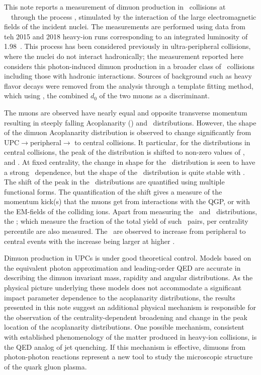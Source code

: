This note reports a measurement of dimuon production in \PbPb\
  collisions at ~\TeV\ through the process \gamgammumu,
  stimulated by the interaction of the large electromagnetic
  fields of the incident nuclei.
The measurements are performed using data from teh 2015 and 2018
  heavy-ion runs corresponding to an integrated luminosity of
  1.98~\inb.
This process has been considered previously in ultra-peripheral
  collisions, where the nuclei do not interact hadronically;
  the measurement reported here considers
  this photon-induced dimuon production in a broader class of \PbPb\
  collisions including those with hadronic interactions.
Sources of background such as heavy flavor decays were removed from
  the analysis through a template fitting method, which using
  \dZeroPair, the combined $d_0$ of the two muons as a discriminant.

The muons are observed have nearly equal and opposite transverse
  momentum resulting in steeply falling Acoplanarity
  (\Aco) and \kperp\ distributions.
However, the shape of the dimuon Acoplanarity distribution is
  observed to change significantly from
  UPC$\longrightarrow$peripheral$\longrightarrow$
  to central collisions.
It particular, for the distributions in central collisions,
  the peak of the distribution is shifted to non-zero values
  of \Aco, and \kperp.
At fixed centrality, the change in shape for the \Aco\
  distribution is seen to have a strong \pt\ dependence,
  but the shape of the \kperp\ distribution is quite stable
  with \pt.
The shift of the peak in the \kperp\ distributions are
  quantified using multiple functional forms.
The quantification of the shift gives a measure of the momentum
  kick(s) that the muons get from interactions with the QGP,
  or with the EM-fields of the colliding ions.
Apart from measuring the \Aco\ and \kperp\ distributions,
  the \NormYields; which measure the fraction of the total
  yield of such \gamgammumu\ pairs, per centrality percentile
  are also measured.
The \NormYields\ are observed to increase from peripheral to
  central events with the increase being larger at higher \pt.


Dimuon production in UPCs is under good theoretical control.
Models based on the equivalent photon approximation and leading-order QED
  are accurate in describing the dimuon invariant mass, rapidity
  and angular distributions.
As the physical picture underlying these models does not accommodate a
  significant impact parameter dependence to the acoplanarity distributions,
  the results presented in this note suggest an additional physical mechanism is
  responsible for the observation of the centrality-dependent broadening
  and change in the peak location of the acoplanarity distributions.
One possible mechanism, consistent with established phenomenology of the matter
  produced in heavy-ion collisions, is the QED analog of jet quenching.
If this mechanism is effective, dimuons from photon-photon reactions represent
  a new tool to study the microscopic structure of the quark gluon plasma.
